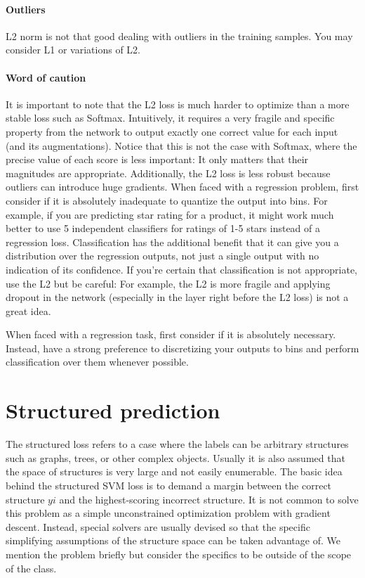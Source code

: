 \paragraph*{Outliers} L2 norm is not that good dealing with outliers in the training samples. You may consider L1 or variations of L2.

\paragraph*{Word of caution} It is important to note that the L2 loss is much harder to optimize than a more stable loss such as Softmax. Intuitively, it requires a very fragile and specific property from the network to output exactly one correct value for each input (and its augmentations). Notice that this is not the case with Softmax, where the precise value of each score is less important: It only matters that their magnitudes are appropriate. Additionally, the L2 loss is less robust because outliers can introduce huge gradients. When faced with a regression problem, first consider if it is absolutely inadequate to quantize the output into bins. For example, if you are predicting star rating for a product, it might work much better to use 5 independent classifiers for ratings of 1-5 stars instead of a regression loss. Classification has the additional benefit that it can give you a distribution over the regression outputs, not just a single output with no indication of its confidence. If you’re certain that classification is not appropriate, use the L2 but be careful: For example, the L2 is more fragile and applying dropout in the network (especially in the layer right before the L2 loss) is not a great idea.

When faced with a regression task, first consider if it is absolutely necessary. Instead, have a strong preference to discretizing your outputs to bins and perform classification over them whenever possible.

\section*{Structured prediction}
The structured loss refers to a case where the labels can be arbitrary structures such as graphs, trees, or other complex objects. Usually it is also assumed that the space of structures is very large and not easily enumerable. The basic idea behind the structured SVM loss is to demand a margin between the correct structure $yi$ and the highest-scoring incorrect structure. It is not common to solve this problem as a simple unconstrained optimization problem with gradient descent. Instead, special solvers are usually devised so that the specific simplifying assumptions of the structure space can be taken advantage of. We mention the problem briefly but consider the specifics to be outside of the scope of the class.